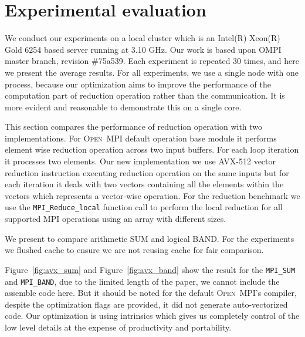 \documentclass[sigconf,review]{acmart}
\newcommand{\mpifunc}[1]{\lstinline"MPI_#1"\xspace}
\newcommand{\ompi}[0]{\textsc{Open~MPI}\xspace}
\begin{document}
\section{Experimental evaluation}\label{sec:experiments}
We conduct our experiments on a local cluster which is an Intel(R) Xeon(R) Gold 6254 based server running at 3.10 GHz. Our work is based upon OMPI master branch, revision \#75a539. Each experiment is repeated 30 times, and here we present the average results. For all experiments, we use a single node with one process, because our optimization aims to improve the performance of the computation part of reduction operation rather than the communication. It is more evident and reasonable to demonstrate this on a single core.

This section compares the performance of reduction operation with two
implementations.
For \ompi default operation base module it
performs element wise reduction operation across two input buffers. For each loop iteration
it processes two elements. Our new implementation we use AVX-512 vector reduction instruction
executing reduction operation on the same inputs but for each iteration it
deals with two vectors containing all the elements within the vectors which represents
a vector-wise operation.
For the reduction benchmark we use the \mpifunc{Reduce_local} function call to
perform the local reduction for all supported MPI operations using an array with different sizes.

We present to compare arithmetic SUM and logical BAND.
For the experiments we flushed cache to ensure we are not reusing cache for fair comparison.

Figure~\ref{fig:avx_sum} and Figure~\ref{fig:avx_band} show the result for the
\mpifunc{SUM} and \mpifunc{BAND}, due to the limited length of the paper, we cannot
include the assemble code here. But it should be noted for the default \ompi's compiler, despite
the optimization flags are provided, it did not generate auto-vectorized code. Our optimization is
using intrinsics which gives us completely control of the low
level details at the expense of productivity and portability.
\end{document}
